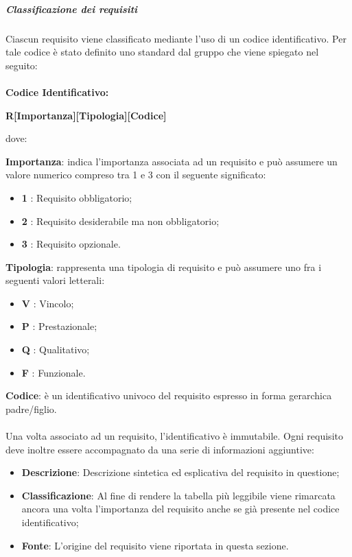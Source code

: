         \subparagraph{Classificazione dei requisiti} \label{subparagraph:Classificazione dei requisiti}
        Ciascun requisito viene classificato mediante l'uso di un codice identificativo. Per tale codice è stato definito uno standard dal gruppo che viene spiegato nel seguito:\\\\
        \textbf{Codice Identificativo:}\\
        \begin{center}
            \textbf{\LARGE{R[Importanza][Tipologia][Codice]}}
        \end{center}
        dove:

        \textbf{Importanza}: indica l'importanza associata ad un requisito e può assumere un valore numerico compreso tra 1 e 3 con il seguente significato:
            \begin{itemize}[label={}]
                \item \textbf{1} : Requisito obbligatorio;
                \item \textbf{2} : Requisito desiderabile ma non obbligatorio;
                \item \textbf{3} : Requisito opzionale.
            \end{itemize}

        \textbf{Tipologia}: rappresenta una tipologia di requisito e può assumere uno fra i seguenti valori letterali:
        \begin{itemize}[label={}]
            \item \textbf{V} : Vincolo;
            \item \textbf{P} : Prestazionale;
            \item \textbf{Q} : Qualitativo;
            \item \textbf{F} : Funzionale.
        \end{itemize}

        \textbf{Codice}: è un identificativo univoco del requisito espresso in forma gerarchica padre/figlio.
        \\
        \\
        Una volta associato ad un requisito, l'identificativo è immutabile.
        Ogni requisito deve inoltre essere accompagnato da una serie di informazioni aggiuntive:
        \begin{itemize}
            \item \textbf{Descrizione}: Descrizione sintetica ed esplicativa del requisito in questione;
            \item \textbf{Classificazione}: Al fine di rendere la tabella più leggibile viene rimarcata ancora una volta l'importanza del requisito anche se già presente nel codice identificativo;
            \item \textbf{Fonte}: L'origine del requisito viene riportata in questa sezione.
        \end{itemize}

